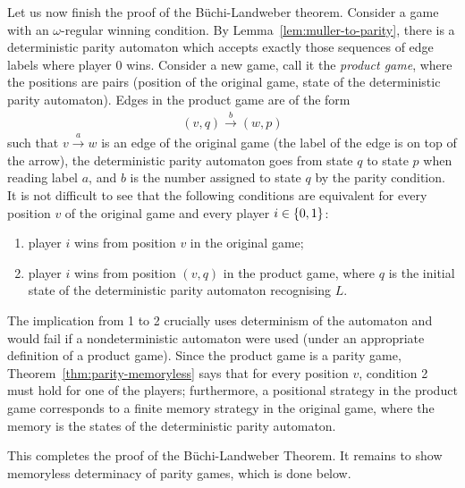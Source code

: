 Let us now finish the proof of the Büchi-Landweber theorem. Consider a game with an $\omega$-regular winning condition. By Lemma~\ref{lem:muller-to-parity}, there is a deterministic parity automaton which accepts exactly those sequences of edge labels where player $0$ wins. Consider a new game, call it the \emph{product game}, \label{page:product-game}   where the positions are pairs (position of the original game, state of the deterministic parity automaton). Edges in the product  game are  of the form
\begin{align*}
  (v,q) \stackrel b \to (w,p)
\end{align*}
such that $v \stackrel a \to w$ is an edge of the original game (the label of the edge is on top of the arrow),  the deterministic parity automaton goes from state $q$ to state $p$ when reading  label $a$, and $b$ is the number assigned to state $q$ by the parity condition.
  It is not difficult to see that the following conditions are equivalent for every position $v$ of the original game and every player $i \in \{0,1\}$:
\begin{enumerate}
	\item player $i$ wins from position $v$ in the original game;
\item player $i$ wins from position $(v,q)$ in the product game, where $q$ is the initial state of the deterministic parity automaton recognising $L$.
\end{enumerate}

The implication from 1 to 2 crucially uses determinism of the automaton and would fail if a nondeterministic automaton were used (under an appropriate definition of a product game). Since the product game is a parity game, Theorem~\ref{thm:parity-memoryless} says that  for every position $v$, condition 2 must hold for one of the players; furthermore, a positional strategy in the product game corresponds to a finite memory strategy in the original game, where the memory is the states of the deterministic parity automaton.

This completes the proof of the Büchi-Landweber Theorem. It remains to show memoryless determinacy of parity games, which is done below.
